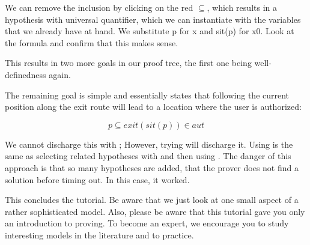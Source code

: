 We can remove the inclusion by clicking on the red $\subseteq$, which results in a hypothesis with universal quantifier, which we can instantiate with the variables that we already have at hand.  We substitute p for x and sit(p) for x0.  Look at the formula and confirm that this makes sense.

This results in two more goals in our proof tree, the first one being well-definedness again.

The remaining goal is simple and essentially states that following the current position along the exit route will lead to a location where the user is authorized:

$$ p \subseteq exit(sit(p)) \in aut $$

We cannot discharge this with ; However, trying  will discharge it.  Using  is the same as selecting related hypotheses with  and then using .  The danger of this approach is that so many hypotheses are added, that the prover does not find a solution before timing out.  In this case, it worked.



This concludes the tutorial. Be aware that we just look at one small aspect of a rather sophisticated model.  Also, please be aware that this tutorial gave you only an introduction to proving.  To become an expert, we encourage you to study interesting models in the literature and to practice.

